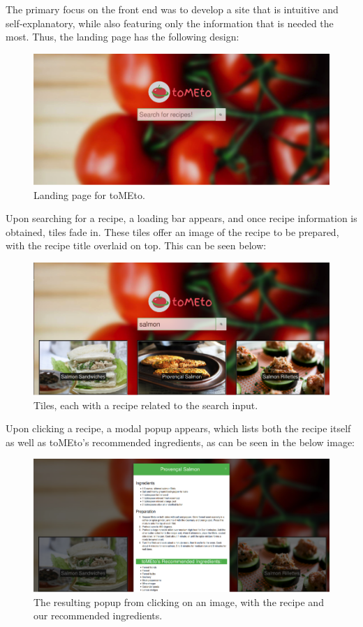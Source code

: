\documentclass{acm_proc_article-sp}
\begin{document}
The primary focus on the front end was to develop a site that is intuitive and self-explanatory, while also featuring only the information that is needed the most. Thus, the landing page has the following design:

\begin{figure}[H]
\includegraphics[scale=0.5]{p1.png}
\caption{Landing page for toMEto.}
\end{figure}


Upon searching for a recipe, a loading bar appears, and once recipe information is obtained, tiles fade in. These tiles offer an image of the recipe to be prepared, with the recipe title overlaid on top. This can be seen below:

\begin{figure}[H]
\includegraphics[scale=0.5]{p2.png}
\caption{Tiles, each with a recipe related to the search input.}
\end{figure}

Upon clicking a recipe, a modal popup appears, which lists both the recipe itself as well as toMEto's recommended ingredients, as can be seen in the below image:

\begin{figure}[H]
\includegraphics[scale=0.5]{p3.png}
\caption{The resulting popup from clicking on an image, with the recipe and our recommended ingredients.}
\end{figure}
\end{document}
